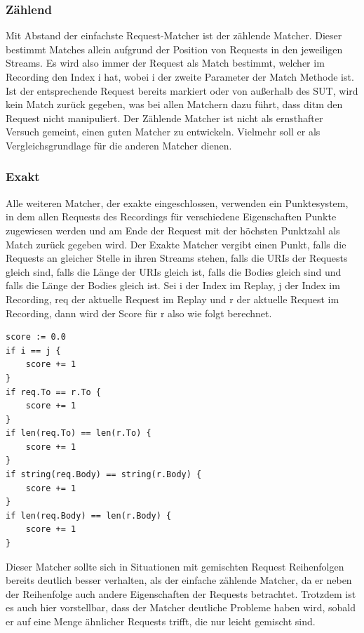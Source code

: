 \documentclass[12pt,a4paper]{report}
\begin{document}
\subsubsection{Zählend}
Mit Abstand der einfachste Request-Matcher ist der zählende Matcher. Dieser bestimmt Matches allein aufgrund der Position
von Requests in den jeweiligen Streams. Es wird also immer der Request als Match bestimmt, welcher im Recording den Index i hat,
wobei i der zweite Parameter der Match Methode ist. Ist der entsprechende Request bereits markiert oder von außerhalb des SUT,
wird kein Match zurück gegeben, was bei allen Matchern dazu führt, dass ditm den Request nicht manipuliert.
Der Zählende Matcher ist nicht als ernsthafter Versuch gemeint, einen guten Matcher zu entwickeln. Vielmehr soll
er als Vergleichsgrundlage für die anderen Matcher dienen.

\subsubsection{Exakt}
Alle weiteren Matcher, der exakte eingeschlossen, verwenden ein Punktesystem, in dem allen Requests des Recordings für verschiedene
Eigenschaften Punkte zugewiesen werden und am Ende der Request mit der höchsten Punktzahl als Match zurück gegeben wird.
Der Exakte Matcher vergibt einen Punkt, falls die Requests an gleicher Stelle in ihren Streams stehen, falls die URIs der
Requests gleich sind, falls die Länge der URIs gleich ist, falls die Bodies gleich sind und falls die Länge der Bodies gleich ist.
Sei i der Index im Replay, j der Index im Recording, req der aktuelle Request im Replay und r der aktuelle
Request im Recording, dann wird der Score für r also wie folgt berechnet.
\begin{lstlisting}
score := 0.0
if i == j {
    score += 1
}
if req.To == r.To {
    score += 1
}
if len(req.To) == len(r.To) {
    score += 1
}
if string(req.Body) == string(r.Body) {
    score += 1
}
if len(req.Body) == len(r.Body) {
    score += 1
}
\end{lstlisting}
Dieser Matcher sollte sich in Situationen mit gemischten Request Reihenfolgen bereits deutlich besser verhalten, als der
einfache zählende Matcher, da er neben der Reihenfolge auch andere Eigenschaften der Requests betrachtet. Trotzdem ist es auch
hier vorstellbar, dass der Matcher deutliche Probleme haben wird, sobald er auf eine Menge ähnlicher Requests trifft, die nur
leicht gemischt sind.
\end{document}
